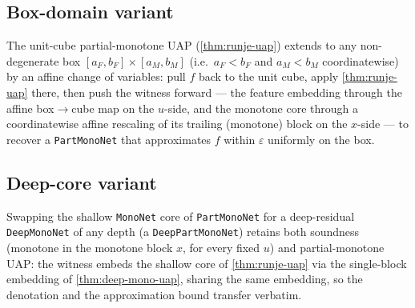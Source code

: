 \subsection{Box-domain variant}

\begin{theorem}\label{thm:runje-uap-box}
  \leanok
  The unit-cube partial-monotone UAP (\cref{thm:runje-uap}) extends to any non-degenerate box
  $[a_F,b_F]\times[a_M,b_M]$ (i.e.\ $a_F<b_F$ and $a_M<b_M$ coordinatewise) by an affine change of
  variables: pull $f$ back to the unit cube, apply \cref{thm:runje-uap} there, then push the
  witness forward --- the feature embedding through the affine box$\to$cube map on the $u$-side,
  and the monotone core through a coordinatewise affine rescaling of its trailing (monotone) block
  on the $x$-side --- to recover a \texttt{PartMonoNet} that approximates $f$ within $\varepsilon$
  uniformly on the box.
\end{theorem}

\subsection{Deep-core variant}

\begin{theorem}\label{thm:deep-part-uap}
  \leanok
  Swapping the shallow \texttt{MonoNet} core of \texttt{PartMonoNet} for a deep-residual
  \texttt{DeepMonoNet} of any depth (a \texttt{DeepPartMonoNet}) retains both soundness (monotone in
  the monotone block $x$, for every fixed $u$) and partial-monotone UAP: the witness embeds the
  shallow core of \cref{thm:runje-uap} via the single-block embedding of
  \cref{thm:deep-mono-uap}, sharing the same embedding, so the denotation and the approximation
  bound transfer verbatim.
\end{theorem}
